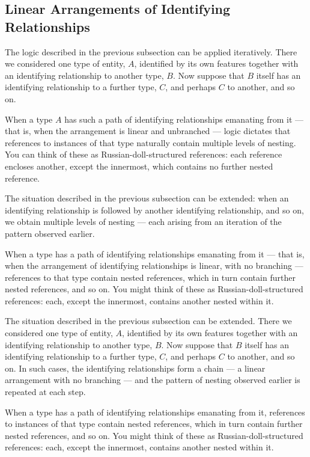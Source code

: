 \subsection{Linear Arrangements of Identifying Relationships}
\begin{newtt}
The logic described in the previous subsection can be applied iteratively.
There we considered one type of entity, $A$, identified by its own features together with an identifying relationship to another type, $B$.
Now suppose that $B$ itself has an identifying relationship to a further type, $C$, and perhaps $C$ to another, and so on.


When a type $A$ has such a path of identifying relationships emanating from it
 — that is, when the arrangement is linear and unbranched — 
 logic dictates that references to instances of that type naturally contain multiple levels of nesting.
You can think of these as Russian-doll-structured references: each reference encloses another, except the innermost, which contains no further nested reference.
\end{newtt}
\begin{oldtt}
\begin{worktt}
The situation described in the previous subsection can be extended: when an identifying relationship is followed by another identifying relationship, and so on, we obtain multiple levels of nesting — each arising from an iteration of the pattern observed earlier.
\end{worktt}
When a type has a path of identifying relationships emanating from it — that is, when the arrangement of identifying relationships is linear, with no branching — references to that type contain nested references, which in turn contain further nested references, and so on.
You might think of these as Russian-doll-structured references: each, except the innermost, contains another nested within it.
\end{oldtt}

The situation described in the previous subsection can be extended.
There we considered one type of entity, $A$, identified by its own features together with an identifying relationship to another type, $B$.
Now suppose that $B$ itself has an identifying relationship to a further type, $C$, and perhaps $C$ to another, and so on.
In such cases, the identifying relationships form a chain — a linear arrangement with no branching — and the pattern of nesting observed earlier is repeated at each step.

When a type has a path of identifying relationships emanating from it, references to instances of that type contain nested references, which in turn contain further nested references, and so on.
You might think of these as Russian-doll-structured references: each, except the innermost, contains another nested within it.


